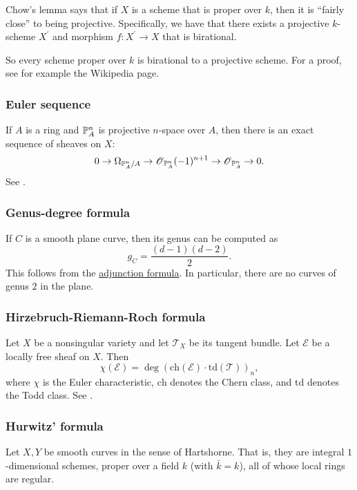 \documentclass[11pt, english]{article}
\begin{document}
Chow's lemma says that if $X$ is a scheme that is proper over $k$, then it is ``fairly close'' to being projective. Specifically, we have that there exists a projective $k$-scheme $X^\prime$ and morphism $f:X^\prime \to X$ that is birational.

So every scheme proper over $k$ is birational to a projective scheme. For a proof, see for example the Wikipedia page.

\subsubsection{Euler sequence}
\label{eulersequence}
If $A$ is a ring and $\mathbb{P}_A^n$ is projective $n$-space over $A$, then there is an exact sequence of sheaves on $X$:
\[
0 \to \Omega_{\mathbb{P}^n_A/A} \to \operatorname{\mathscr{O}}_{\mathbb{P}^n_A}(-1)^{n+1} \to \operatorname{\mathscr{O}}_{\mathbb{P}_A^n} \to 0.
\]
See \cite[Thm II.8.13]{hartshorne}.

\subsubsection{Genus-degree formula}
\label{genusdegree}

If $C$ is a smooth plane curve, then its genus can be computed as
\[
g_C = \frac{(d-1)(d-2)}{2}.
\]
This follows from the \hyperref[adjunction]{adjunction formula}. In particular, there are no curves of genus $2$ in the plane.

\subsubsection{Hirzebruch-Riemann-Roch formula}
\label{hirzebruchriemannroch}

Let $X$ be a nonsingular variety and let $\mathscr T_X$ be its tangent bundle. Let $\mathscr E$ be a locally free sheaf on $X$. Then
\[
\chi(\mathscr E) = \deg {\left( \mathrm{ch}(\mathscr E) \cdot \mathrm{td}(\mathscr T) \right)}_{n},
\]
where $\chi$ is the Euler characteristic, $\mathrm{ch}$ denotes the Chern class, and $\mathrm{td}$ denotes the Todd class. See \cite[Appendix A]{hartshorne}.

\subsubsection{Hurwitz' formula}
\label{hurwitzformula}

Let $X,Y$ be smooth curves in the sense of Hartshorne. That is, they are integral $1$-dimensional schemes, proper over a field $k$ (with $\bar k = k$), all of whose local rings are regular.
\end{document}
